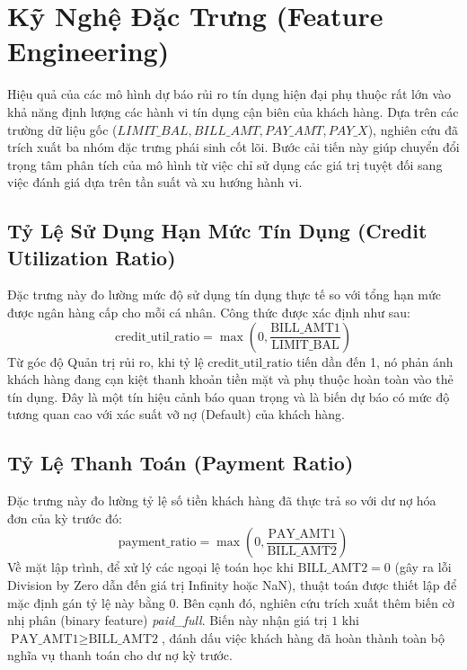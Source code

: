 \section{Kỹ Nghệ Đặc Trưng (Feature Engineering)}

Hiệu quả của các mô hình dự báo rủi ro tín dụng hiện đại phụ thuộc rất lớn vào khả năng định lượng các hành vi tín dụng cận biên của khách hàng. Dựa trên các trường dữ liệu gốc ($LIMIT\_BAL, BILL\_AMT, PAY\_AMT, PAY\_X$), nghiên cứu đã trích xuất ba nhóm đặc trưng phái sinh cốt lõi. Bước cải tiến này giúp chuyển đổi trọng tâm phân tích của mô hình từ việc chỉ sử dụng các giá trị tuyệt đối sang việc đánh giá dựa trên tần suất và xu hướng hành vi.

\subsection{Tỷ Lệ Sử Dụng Hạn Mức Tín Dụng (Credit Utilization Ratio)}
Đặc trưng này đo lường mức độ sử dụng tín dụng thực tế so với tổng hạn mức được ngân hàng cấp cho mỗi cá nhân. Công thức được xác định như sau:
\begin{equation}
    \text{credit\_util\_ratio} = \max\left(0, \frac{\text{BILL\_AMT1}}{\text{LIMIT\_BAL}}\right)
\end{equation}
Từ góc độ Quản trị rủi ro, khi tỷ lệ $\text{credit\_util\_ratio}$ tiến dần đến 1, nó phản ánh khách hàng đang cạn kiệt thanh khoản tiền mặt và phụ thuộc hoàn toàn vào thẻ tín dụng. Đây là một tín hiệu cảnh báo quan trọng và là biến dự báo có mức độ tương quan cao với xác suất vỡ nợ (Default) của khách hàng.

\subsection{Tỷ Lệ Thanh Toán (Payment Ratio)}
Đặc trưng này đo lường tỷ lệ số tiền khách hàng đã thực trả so với dư nợ hóa đơn của kỳ trước đó:
\begin{equation}
    \text{payment\_ratio} = \max\left(0, \frac{\text{PAY\_AMT1}}{\text{BILL\_AMT2}}\right)
\end{equation}
Về mặt lập trình, để xử lý các ngoại lệ toán học khi $\text{BILL\_AMT2} = 0$ (gây ra lỗi Division by Zero dẫn đến giá trị Infinity hoặc NaN), thuật toán được thiết lập để mặc định gán tỷ lệ này bằng 0. Bên cạnh đó, nghiên cứu trích xuất thêm biến cờ nhị phân (binary feature) \textit{paid\_full}. Biến này nhận giá trị $1$ khi $\text{PAY\_AMT1} \geq \text{BILL\_AMT2}$, đánh dấu việc khách hàng đã hoàn thành toàn bộ nghĩa vụ thanh toán cho dư nợ kỳ trước.

